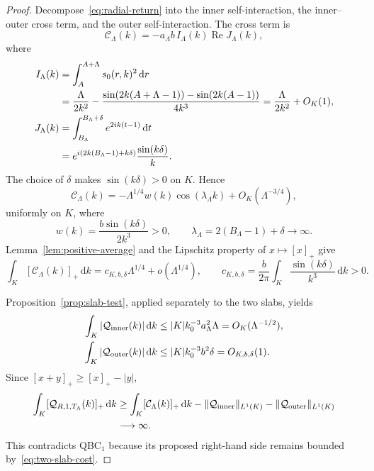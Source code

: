 \documentclass[11pt]{article}
\newcommand{\dd}{\,\mathrm d}
\newcommand{\cQ}{\mathcal Q}
\newcommand{\cC}{\mathcal C}
\DeclareMathOperator{\Rea}{Re}
\theoremstyle{definition}
\begin{document}
\begin{proof}
Decompose~\eqref{eq:radial-return} into the inner self-interaction, the inner--outer cross term, and the outer self-interaction.  The cross term is
\begin{equation}
 \cC_\Lambda(k)
 =-a_\Lambda b\,I_\Lambda(k)\Rea J_\Lambda(k),
 \label{eq:cross-term}
\end{equation}
where
\begin{align}
 I_\Lambda(k)
 &=\int_A^{A+\Lambda}s_0(r,k)^2\dd r\notag\\
 &=\frac{\Lambda}{2k^2}
 -\frac{\sin(2k(A+\Lambda-1))-\sin(2k(A-1))}{4k^3}
 =\frac{\Lambda}{2k^2}+O_K(1),
 \label{eq:inner-mass}\\
 J_\Lambda(k)
 &=\int_{B_\Lambda}^{B_\Lambda+\delta}e^{2ik(t-1)}\dd t\notag\\
 &=e^{i(2k(B_\Lambda-1)+k\delta)}\frac{\sin(k\delta)}{k}.
 \label{eq:outer-wave}
\end{align}
The choice of $\delta$ makes $\sin(k\delta)>0$ on $K$.  Hence
\begin{equation}
 \cC_\Lambda(k)
 =-\Lambda^{1/4}w(k)
 \cos\!\left(\lambda_\Lambda k\right)+O_K(\Lambda^{-3/4}),
 \label{eq:cross-asymptotic}
\end{equation}
uniformly on $K$, where
\begin{equation}
 w(k)=\frac{b\sin(k\delta)}{2k^3}>0,
 \qquad
 \lambda_\Lambda=2(B_\Lambda-1)+\delta\longrightarrow\infty.
\end{equation}
Lemma~\ref{lem:positive-average} and the Lipschitz property of $x\mapsto[x]_+$ give
\begin{equation}
 \int_K[\cC_\Lambda(k)]_+\dd k
 =c_{K,b,\delta}\Lambda^{1/4}+o(\Lambda^{1/4}),
 \qquad
 c_{K,b,\delta}
 =\frac{b}{2\pi}\int_K\frac{\sin(k\delta)}{k^3}\dd k>0.
 \label{eq:cross-positive-growth}
\end{equation}

Proposition~\ref{prop:slab-test}, applied separately to the two slabs, yields
\begin{align}
 \int_K|\cQ_{\rm inner}(k)|\dd k
 &\leq |K|k_0^{-3}a_\Lambda^2\Lambda
 =O_K(\Lambda^{-1/2}),\label{eq:inner-self-bound}\\
 \int_K|\cQ_{\rm outer}(k)|\dd k
 &\leq |K|k_0^{-3}b^2\delta
 =O_{K,b,\delta}(1).
 \label{eq:outer-self-bound}
\end{align}
Since $[x+y]_+\geq[x]_+-|y|$,
\begin{align}
 \int_K[\cQ_{R,1,T_\Lambda}(k)]_+\dd k
 &\geq\int_K[\cC_\Lambda(k)]_+\dd k
 -\|\cQ_{\rm inner}\|_{L^1(K)}
 -\|\cQ_{\rm outer}\|_{L^1(K)}\notag\\
 &\longrightarrow\infty.
\end{align}
This contradicts QBC$_1$ because its proposed right-hand side remains bounded by~\eqref{eq:two-slab-cost}.
\end{proof}
\end{document}
